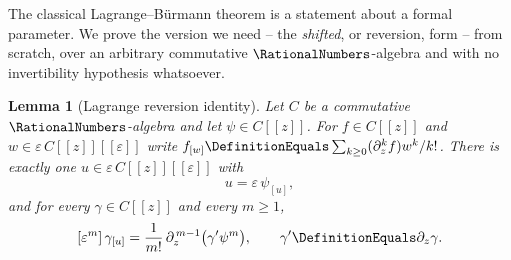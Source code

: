 \documentclass[11pt,oneside]{article}
\theoremstyle{plain}
\newtheorem{lemma}[theorem]{Lemma}
\theoremstyle{definition}
\theoremstyle{remark}
\begin{document}
The classical Lagrange--B\"urmann theorem is a statement about a formal
parameter.  We prove the version we need -- the \emph{shifted}, or reversion,
form -- from scratch, over an arbitrary commutative \(\RationalNumbers\)-algebra
and with no invertibility hypothesis whatsoever.

\begin{lemma}[Lagrange reversion identity]
\label{plt:lem:lag-abstract}
Let \(C\) be a commutative \(\RationalNumbers\)-algebra and let
\(\psi\in C[[z]]\).  For \(f\in C[[z]]\) and
\(w\in\varepsilon\,C[[z]][[\varepsilon]]\) write
\(f_{[w]}\DefinitionEquals\sum_{k\ge0}(\partial_z^kf)w^k/k!\).  There is exactly one
\(u\in\varepsilon\,C[[z]][[\varepsilon]]\) with
\begin{equation}
\label{plt:eq:lag-param-fixedpoint}
  u=\varepsilon\,\psi_{[u]},
\end{equation}
and for every \(\gamma\in C[[z]]\) and every \(m\ge1\),
\begin{equation}
\label{plt:eq:lag-param}
  [\varepsilon^m]\,\gamma_{[u]}
  =\frac1{m!}\,\partial_z^{\,m-1}\bigl(\gamma'\psi^m\bigr),
  \qquad \gamma'\DefinitionEquals\partial_z\gamma .
\end{equation}
\end{lemma}
\end{document}
